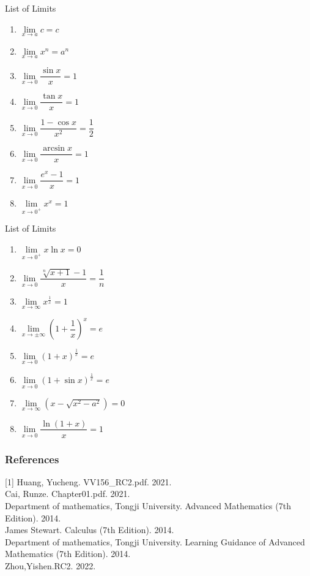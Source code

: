 \begin{frame}{List of Limits}
    \begin{enumerate}[1]
        \item $\lim\limits_{x \rightarrow a} c=c $
        \item $\lim\limits_{x \rightarrow a} x^{n}=a^{n}$
        \item $\lim\limits_{x \rightarrow 0} \dfrac{\sin x}{x}=1$
        \item $\lim\limits_{x \rightarrow 0} \dfrac{\tan x}{x}=1$
        \item $\lim\limits_{x \rightarrow 0} \dfrac{1-\cos x}{x^{2}}=\dfrac{1}{2}$
        \item $\lim\limits_{x \rightarrow 0} \dfrac{\arcsin x}{x}=1$
        \item $\lim\limits_{x \rightarrow 0} \dfrac{e^{x}-1}{x}=1$
        \item $\lim\limits_{x \rightarrow 0^{+}} x^{x}=1$
    \end{enumerate}
\end{frame}
\begin{frame}{List of Limits}
    \begin{enumerate}[1]
        \item $\lim\limits_{x \rightarrow 0^{+}} x \ln x=0$
        \item $\lim\limits_{x \rightarrow 0} \dfrac{\sqrt[n]{x+1}-1}{x}=\dfrac{1}{n}$
        \item $\lim\limits_{x \rightarrow \infty} x^{\frac{1}{x}}=1$
        \item $\lim\limits_{x \rightarrow \pm \infty}\left(1+\dfrac{1}{x}\right)^{x}=e$
        \item $\lim\limits_{x \rightarrow 0}(1+x)^{\frac{1}{x}}=e$
        \item $\lim\limits_{x \rightarrow 0}(1+\sin x)^{\frac{1}{x}}=e$
        \item $\lim\limits_{x \rightarrow \infty}\left(x-\sqrt{x^{2}-a^{2}}\right)=0$
        \item $\lim\limits_{x \rightarrow 0} \dfrac{\ln{(1+x)} }{x}=1$
    \end{enumerate}
\end{frame}

\begin{frame}
    \frametitle{References}
    [1] Huang, Yucheng. VV156\_RC2.pdf. 2021.\\
    \bigskip
    [2] Cai, Runze. Chapter01.pdf. 2021.\\
    \bigskip
    [3] Department of mathematics, Tongji University. Advanced Mathematics (7th Edition). 2014.\\
    \bigskip
    [4] James Stewart. Calculus (7th Edition). 2014.\\
    \bigskip
    [5] Department of mathematics, Tongji University. Learning Guidance of Advanced Mathematics (7th Edition). 2014.\\
    \bigskip
    [6]Zhou,Yishen.RC2. 2022.
\end{frame}
